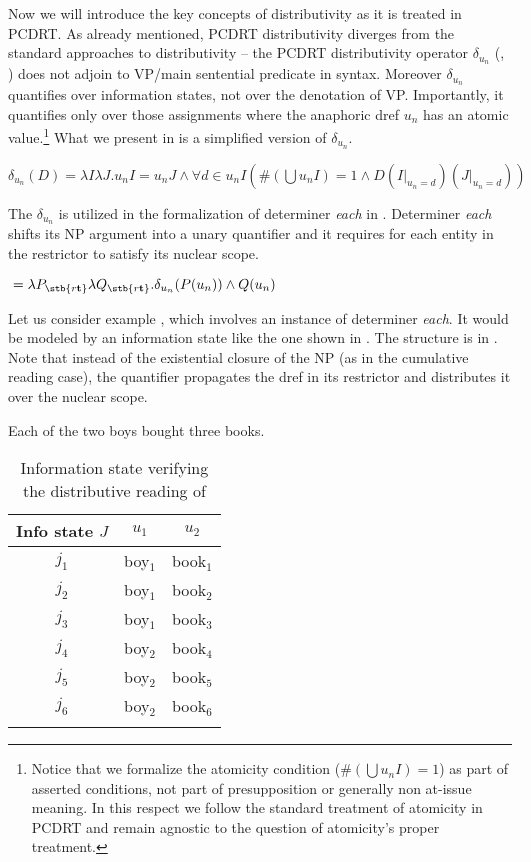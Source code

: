 \documentclass[output=paper,colorlinks,citecolor=brown,newtxmath]{langscibook}
\begin{document}
\largerpage
Now we will introduce the key concepts of distributivity as it is treated in PCDRT. As already mentioned, PCDRT distributivity diverges from the standard approaches to distributivity -- the PCDRT distributivity operator $\delta_{u_n}$ (\citealt{Nouwen2003}, \citealt{Vandenberg1996}) does not adjoin to VP/main sentential predicate in syntax. Moreover $\delta_{u_n}$ quantifies over information states, not over the denotation of VP. Importantly, it quantifies only over those assignments where the anaphoric dref $u_n$ has an atomic value.\footnote{Notice that we formalize the atomicity condition ($\#(\bigcup u_n I)=1$) as part of asserted conditions, not part of presupposition or generally non at-issue meaning. In this respect we follow the standard treatment of atomicity in PCDRT and remain agnostic to the question of atomicity's proper treatment.}
What we present in  is a simplified version of  $\delta_{u_n}$.

\ea \label{def:delta}$\delta_{u_n}(D) = \lambda I\lambda J.u_n I=u_n J \wedge \forall d \in u_n I(\#(\bigcup u_n I)=1 \wedge D(I|_{u_n=d})(J|_{u_n=d}))$
\z

\noindent The $\delta_{u_n}$ is utilized in the formalization of determiner \textit{each} in . Determiner \textit{each} shifts its NP argument into a unary quantifier and it requires for each entity in the restrictor to satisfy its nuclear scope.

\ea\label{def:each-det}
\({}=\lambda P_{\stb{r\textbf{t}}}\lambda Q_{\stb{r\textbf{t}}}.\delta_{u_n}(P(u_n)) \wedge Q(u_n)\)
\z

\noindent Let us consider example , which involves an instance of determiner \textit{each}. It would be modeled by an information state like the one shown in . The structure is in  . Note that instead of the existential closure of the NP (as in the cumulative reading case), the quantifier propagates the dref in its restrictor and distributes it over the nuclear scope.

\ea\label{ex:line434} Each of the two boys bought three books.
\z

\begin{table}
\centering
\begin{tabularx}{0.4\textwidth}{ccc}
\lsptoprule
Info state $J$ & \(u_1\) & \(u_2\)\\
\midrule
\(j_1\) & boy\(_1\) & book\(_1\)\\
\(j_2\) & boy\(_1\) & book\(_2\)\\
\(j_3\) & boy\(_1\) & book\(_3\)\\
\(j_4\) & boy\(_2\) & book\(_4\)\\
\(j_5\) & boy\(_2\) & book\(_5\)\\
\(j_6\) & boy\(_2\) & book\(_6\)\\
\lspbottomrule
\end{tabularx}
\caption{Information state verifying the distributive reading of }
\label{table2}
\end{table}
\end{document}
